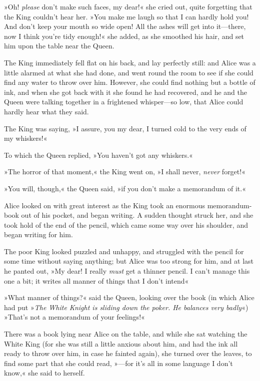 »Oh! \textit{please} don't make such faces, my dear!« she cried out, quite forgetting that the King couldn't hear her. »You make me laugh so that I can hardly hold you! And don't keep your mouth so wide open! All the ashes will get into it—there, now I think you're tidy enough!« she added, as she smoothed his hair, and set him upon the table near the Queen.

The King immediately fell flat on his back, and lay perfectly still: and Alice was a little alarmed at what she had done, and went round the room to see if she could find any water to throw over him. However, she could find nothing but a bottle of ink, and when she got back with it she found he had recovered, and he and the Queen were talking together in a frightened whisper—so low, that Alice could hardly hear what they said.

The King was saying, »I assure, you my dear, I turned cold to the very ends of my whiskers!«

To which the Queen replied, »You haven't got any whiskers.«

»The horror of that moment,« the King went on, »I shall never, \textit{never} forget!«

»You will, though,« the Queen said, »if you don't make a memorandum of it.«

Alice looked on with great interest as the King took an enormous memorandum-book out of his pocket, and began writing. A sudden thought struck her, and she took hold of the end of the pencil, which came some way over his shoulder, and began writing for him.

The poor King looked puzzled and unhappy, and struggled with the pencil for some time without saying anything; but Alice was too strong for him, and at last he panted out, »My dear! I really \textit{must} get a thinner pencil. I can't manage this one a bit; it writes all manner of things that I don't intend\longdash«

»What manner of things?« said the Queen, looking over the book (in which Alice had put »\textit{The White Knight is sliding down the poker. He balances very badly}«) »That's not a memorandum of your feelings!«

There was a book lying near Alice on the table, and while she sat watching the White King (for she was still a little anxious about him, and had the ink all ready to throw over him, in case he fainted again), she turned over the leaves, to find some part that she could read, »—for it's all in some language I don't know,« she said to herself.

